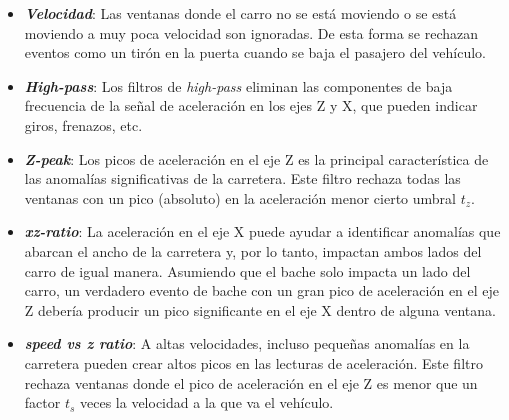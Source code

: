 		\begin{itemize}
			\item \emph{\textbf {Velocidad}}: Las ventanas donde el carro no se está moviendo o se está moviendo a muy poca velocidad son ignoradas. 
				De esta forma se rechazan eventos como un tirón en la puerta cuando se baja el pasajero del vehículo.\\
			\item \emph{\textbf {High-pass}}: Los filtros de \emph{high-pass} eliminan las componentes de baja frecuencia de la señal de aceleración
				en los ejes Z y X, que pueden indicar giros, frenazos, etc.\\
			\item  \emph{\textbf {Z-peak}}: Los picos de aceleración en el eje Z es la principal característica de las anomalías significativas de
				la carretera. Este filtro rechaza todas las ventanas con un pico (absoluto) en la aceleración menor cierto umbral $t_z$.\\
			\item \emph{\textbf {xz-ratio}}: La aceleración en el eje X puede ayudar a identificar anomalías que abarcan el ancho de la carretera
				y, por lo tanto, impactan ambos lados del carro de igual manera.  Asumiendo que el bache solo impacta un lado del carro, un verdadero
				evento de bache con un gran pico de aceleración en el eje Z debería producir un pico significante en el eje X dentro de alguna
				ventana.\\
			\item \emph{\textbf {speed vs z ratio}}: A altas velocidades, incluso pequeñas anomalías en la carretera pueden crear altos picos en las
				lecturas de aceleración. Este filtro rechaza ventanas donde el pico de aceleración en el eje Z es menor que un factor $t_s$ veces la
				velocidad a la que va el vehículo.
		\end{itemize}


